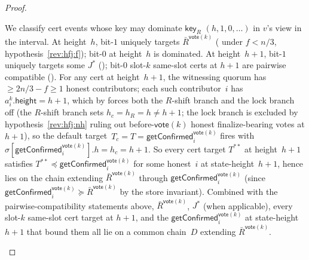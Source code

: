 \ifx\litemode\undefined\documentclass{article}\fi
\newcommand{\height}{\mathsf{height}}
\newcommand{\key}{\mathsf{key}}
\newcommand{\vote}{\mathsf{vote}}
\newcommand{\comm}[1]{\bar{#1}}
\newcommand{\getConfirmed}{\textsf{getConfirmed}\xspace}
\theoremstyle{plain}
\theoremstyle{definition}
\theoremstyle{remark}
\begin{document}
\begin{proof}
\begin{description}
We classify cert events whose key may dominate $\key_R$ $(h, 1, 0, \ldots)$ in $v$'s view in the interval. At height~$h$, bit-$1$ uniquely targets $\comm{R}^{\vote(k)}$ ( under $f<n/3$, hypothesis~\ref{rev:hfj:f}); bit-$0$ at height~$h$ is dominated. At height~$h+1$, bit-$1$ uniquely targets some $J^*$ (); bit-$0$ slot-$k$ same-slot certs at $h+1$ are pairwise compatible (). For any cert at height~$h+1$, the witnessing quorum has $\geq 2n/3 - f \geq 1$ honest contributors; each such contributor~$i$ has $a^k_i.\height = h+1$, which by  forces both the $R$-shift branch and the lock branch off (the $R$-shift branch sets $h_c = h_R = h \neq h+1$; the lock branch is excluded by hypothesis~\ref{rev:hfj:nh} ruling out before-$\vote(k)$ honest finalize-bearing votes at $h+1$), so the default target~$T_c = T = \getConfirmed_i^{\vote(k)}$ fires with $\sigma[\getConfirmed_i^{\vote(k)}].h = h_c = h+1$. So every cert target $T^{**}$ at height~$h+1$ satisfies $T^{**} \preceq \getConfirmed_i^{\vote(k)}$ for some honest~$i$ at state-height~$h+1$, hence lies on the chain extending $\comm{R}^{\vote(k)}$ through $\getConfirmed_i^{\vote(k)}$ (since $\getConfirmed_i^{\vote(k)} \succeq \comm{R}^{\vote(k)}$ by the store invariant). Combined with the pairwise-compatibility statements above, $\comm{R}^{\vote(k)}$, $J^*$ (when applicable), every slot-$k$ same-slot cert target at $h+1$, and the $\getConfirmed_i^{\vote(k)}$ at state-height~$h+1$ that bound them all lie on a common chain~$D$ extending $\comm{R}^{\vote(k)}$.


\end{description}
\end{proof}
\end{document}
